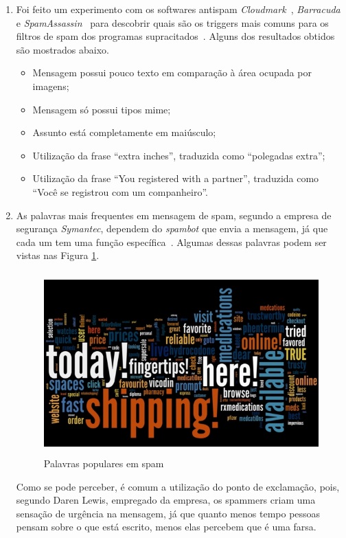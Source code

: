 \documentclass[a4paper,dvipdfm]{article}
\begin{document}
\begin{enumerate}
	\item
		Foi feito um experimento com os softwares antispam \emph{Cloudmark}~\cite{cloudmark}, \emph{Barracuda}~\cite{barracuda} e \emph{SpamAssassin}~\cite{spamassassin} para descobrir quais são os \glspl{trigger} mais comuns para os filtros de spam dos programas supracitados~\cite{spam:trigger}.
		Alguns dos resultados obtidos são mostrados abaixo.
		\begin{itemize}
			\item Mensagem possui pouco texto em comparação à área ocupada por imagens;
			\item Mensagem só possui tipos \gls{mime};
			\item Assunto está completamente em maiúsculo;
			\item Utilização da frase ``extra inches'', traduzida como ``polegadas extra'';
			\item Utilização da frase ``You registered with a partner'', traduzida como ``Você se registrou com um companheiro''.
		\end{itemize}
	
	\item
		As palavras mais frequentes em mensagem de spam, segundo a empresa de segurança \emph{Symantec}, dependem do \emph{spambot} que envia a mensagem, já que cada um tem uma função específica~\cite{spam:words}.
		Algumas dessas palavras podem ser vistas nas Figura \ref{fig:wordlist}.
	
		\begin{figure}[h!]
			\centering
			\includegraphics[height=7cm]{Imagens/spam/words-shipping.jpg}
			\caption{Palavras populares em spam}
			\label{fig:wordlist}
		\end{figure}
	
		Como se pode perceber, é comum a utilização do ponto de exclamação, pois, segundo Daren Lewis, empregado da empresa, os \glspl{spammer} criam uma sensação de urgência na mensagem, já que quanto menos tempo pessoas pensam sobre o que está escrito, menos elas percebem que é uma farsa.
	\end{enumerate}
	
\end{document}
